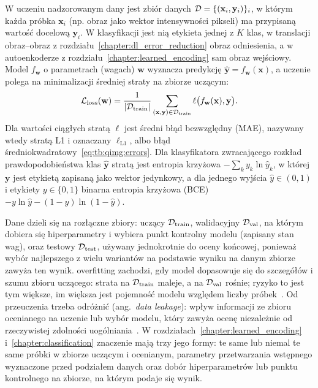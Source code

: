 W uczeniu nadzorowanym dany jest zbiór danych $\mathcal{D}=\{(\mathbf{x}_i,\mathbf{y}_i)\}_{i}$, w którym każda próbka $\mathbf{x}_i$ (np. obraz jako wektor intensywności pikseli) ma przypisaną wartość docelową $\mathbf{y}_i$.
W klasyfikacji jest nią etykieta jednej z $K$ klas, w translacji obraz--obraz z rozdziału~\ref{chapter:dl_error_reduction} obraz odniesienia, a w autoenkoderze z rozdziału~\ref{chapter:learned_encoding} sam obraz wejściowy.
Model $f_{\mathbf{w}}$ o parametrach (wagach) $\mathbf{w}$ wyznacza predykcję $\hat{\mathbf{y}}=f_{\mathbf{w}}(\mathbf{x})$, a uczenie polega na minimalizacji średniej straty na zbiorze uczącym:
\begin{equation}\label{eq:tb:ml:risk}
\mathcal{L}_{\mathrm{loss}}(\mathbf{w})=\frac{1}{|\mathcal{D}_{\mathrm{train}}|}\sum_{(\mathbf{x},\mathbf{y})\in\mathcal{D}_{\mathrm{train}}}\ell\bigl(f_{\mathbf{w}}(\mathbf{x}),\mathbf{y}\bigr).
\end{equation}
Dla wartości ciągłych stratą $\ell$ jest średni błąd bezwzględny (MAE), nazywany wtedy stratą L1 i oznaczany $\ell_{\mathrm{L1}}$, albo błąd średniokwadratowy~\eqref{eq:tb:qimg:errors}.
Dla klasyfikatora zwracającego rozkład prawdopodobieństwa klas $\hat{\mathbf{y}}$ stratą jest entropia krzyżowa $-\sum_{k}y_k\ln\hat{y}_k$, w której $\mathbf{y}$ jest etykietą zapisaną jako wektor jedynkowy, a dla jednego wyjścia $\hat{y}\in(0,1)$ i etykiety $y\in\{0,1\}$ binarna entropia krzyżowa (BCE) $-y\ln\hat{y}-(1-y)\ln(1-\hat{y})$.

Dane dzieli się na rozłączne zbiory: uczący $\mathcal{D}_{\mathrm{train}}$, walidacyjny $\mathcal{D}_{\mathrm{val}}$, na którym dobiera się hiperparametry i wybiera punkt kontrolny modelu (zapisany stan wag), oraz testowy $\mathcal{D}_{\mathrm{test}}$, używany jednokrotnie do oceny końcowej, ponieważ wybór najlepszego z wielu wariantów na podstawie wyniku na danym zbiorze zawyża ten wynik.
\Gls{overfitting} zachodzi, gdy model dopasowuje się do szczegółów i szumu zbioru uczącego: strata na $\mathcal{D}_{\mathrm{train}}$ maleje, a na $\mathcal{D}_{\mathrm{val}}$ rośnie; ryzyko to jest tym większe, im większa jest pojemność modelu względem liczby próbek~\cite{goodfellow2016deep}.
Od przeuczenia trzeba odróżnić  (ang.~\emph{data leakage}): wpływ informacji ze zbioru ocenianego na uczenie lub wybór modelu, który zawyża ocenę niezależnie od rzeczywistej zdolności uogólniania~\cite{kapoor_leakage_2023}.
W rozdziałach~\ref{chapter:learned_encoding} i~\ref{chapter:classification} znaczenie mają trzy jego formy: te same lub niemal te same próbki w zbiorze uczącym i ocenianym, parametry przetwarzania wstępnego wyznaczone przed podziałem danych oraz dobór hiperparametrów lub punktu kontrolnego na zbiorze, na którym podaje się wynik.

